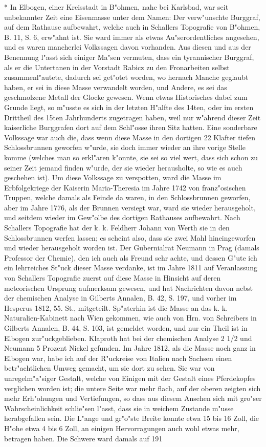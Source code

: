 \documentclass[a4paper, 11pt, oneside, polutonikogreek, german]{article}
\begin{document}
* In Elbogen, einer Kreisstadt in B"ohmen, nahe bei Karlsbad, war seit unbekannter Zeit eine Eisenmasse unter dem Namen: Der verw"unschte Burggraf, auf dem Rathause aufbewahrt, welche auch in Schallers Topografie von B"ohmen, B. 11, S. 6, erw"ahnt ist. Sie ward immer als etwas Au"serordentliches angesehen, und es waren mancherlei Volkssagen davon vorhanden. Aus diesen und aus der Benennung l"asst sich einiger Ma"sen vermuten, dass ein tyrannischer Burggraf, als er die Untertanen in der Vorstadt Rabicz zu den Fronarbeiten selbst zusammenl"autete, dadurch sei get"otet worden, wo hernach Manche geglaubt haben, er sei in diese Masse verwandelt worden, und Andere, es sei das geschmolzene Metall der Glocke gewesen. Wenn etwas Historisches dabei zum Grunde liegt, so m"usste es sich in der letzten H"alfte des 14ten, oder im ersten Drittheil des 15ten Jahrhunderts zugetragen haben, weil nur w"ahrend dieser Zeit kaiserliche Burggrafen dort auf dem Schl"osse ihren Sitz hatten. Eine sonderbare Volkssage war auch die, dass wenn diese Masse in den dortigen 22 Klafter tiefen Schlossbrunnen geworfen w"urde, sie doch immer wieder an ihre vorige Stelle komme (welches man so erkl"aren k"onnte, sie sei so viel wert, dass sich schon zu seiner Zeit jemand finden w"urde, der sie wieder herausholte, so wie es auch geschehen ist). Um diese Volkssage zu verspotten, ward die Masse im Erbfolgekriege der Kaiserin Maria-Theresia im Jahre 1742 von franz"osischen Truppen, welche damals als Feinde da waren, in den Schlossbrunnen geworfen, aber im Jahre 1776, als der Brunnen versiegt war, ward sie wieder herausgeholt, und seitdem wieder im Gew"olbe des dortigen Rathauses aufbewahrt. Nach Schallers Topografie hat der k. k. Feldherr Johann von Werth sie in den Schlossbrunnen werfen lassen; es scheint also, dass sie zwei Mahl hineingeworfen und wieder herausgeholt worden ist. Der Gubernialrat Neumann in Prag (damals Professor der Chemie), den ich auch als Freund sehr achte, und dessen G"ute ich ein lehrreiches St"uck dieser Masse verdanke, ist im Jahre 1811 auf Veranlassung von Schallers Topografie zuerst auf diese Masse in Hinsicht auf deren meteorischen Ursprung aufmerksam gewesen, und hat Nachrichten davon nebst der chemischen Analyse in Gilberts Annalen, B. 42, S. 197, und vorher im Hesperus 1812, 55. St., mitgeteilt. Sp"aterhin ist die Masse an das k. k. Naturalien-Kabinett nach Wien gekommen, wie auch von Hrn. von Schreibers in Gilberts Annalen, B. 44, S. 103, ist gemeldet worden, und nur ein Theil ist in Elbogen zur"uckgeblieben. Klaproth hat bei der chemischen Analyse 2 1/2 und Neumann 5 Prozent Nickel gefunden. Im Jahre 1812, als die Masse noch ganz in Elbogen war, habe ich auf der R"uckreise von Italien nach Sachsen einen betr"achtlichen Umweg gemacht, um sie dort zu sehen. Sie war von unregelm"a"siger Gestalt, welche von Einigen mit der Gestalt eines Pferdekopfes verglichen worden ist; die untere Seite war mehr flach, auf der oberen zeigten sich mehr Erh"ohungen und Vertiefungen, so dass aus diesem Ansehen sich mit gro"ser Wahrscheinlichkeit schlie"sen l"asst, dass sie in weichem Zustande m"usse herabgefallen sein. Die L"ange und gr"o"ste Breite konnte etwa 15 bis 16 Zoll, die H"ohe etwa 4 bis 6 Zoll, an einigen Hervorragungen auch wohl etwas mehr, betragen haben. Die Schwere ward damals auf 191 
\end{document}
